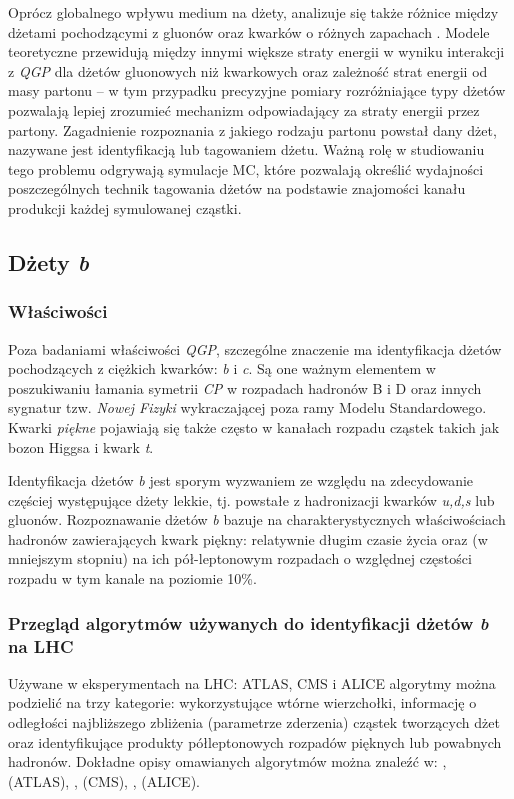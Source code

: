 Oprócz globalnego wpływu medium na dżety, analizuje się także różnice między dżetami pochodzącymi z gluonów oraz kwarków o różnych zapachach . Modele teoretyczne przewidują między innymi większe straty energii w wyniku interakcji z \textit{QGP} dla dżetów gluonowych niż kwarkowych \cite{Salgado:2003gb} oraz zależność strat energii od masy partonu \cite{Dokshitzer:2001zm} -- w tym przypadku precyzyjne pomiary rozróżniające typy dżetów pozwalają lepiej zrozumieć mechanizm odpowiadający za straty energii przez partony. Zagadnienie rozpoznania z jakiego rodzaju partonu powstał dany dżet, nazywane jest identyfikacją lub tagowaniem dżetu.
Ważną rolę w studiowaniu tego problemu odgrywają symulacje MC, które pozwalają określić wydajności poszczególnych technik tagowania dżetów na podstawie znajomości kanału produkcji każdej symulowanej cząstki.

\subsection{Dżety \textit{b}}
\label{subsec:b-dzety}

\subsubsection{Właściwości}
Poza badaniami właściwości \textit{QGP}, szczególne znaczenie ma identyfikacja dżetów pochodzących z ciężkich kwarków: \textit{b} i \textit{c}.
Są one ważnym elementem w poszukiwaniu łamania symetrii \textit{CP} w rozpadach hadronów B i D oraz innych sygnatur tzw. \textit{Nowej Fizyki} wykraczającej poza ramy Modelu Standardowego. 
Kwarki \textit{piękne} pojawiają się także często w kanałach rozpadu cząstek takich jak bozon Higgsa i kwark \textit{t}.

Identyfikacja dżetów \textit{b} jest sporym wyzwaniem ze względu na zdecydowanie częściej występujące dżety lekkie, tj. powstałe z hadronizacji kwarków \textit{u,d,s} lub gluonów.
Rozpoznawanie dżetów \textit{b} bazuje na charakterystycznych właściwościach hadronów zawierających kwark piękny: relatywnie długim czasie życia oraz (w mniejszym stopniu) na ich pół-leptonowym rozpadach o względnej częstości rozpadu w tym kanale  na poziomie 10\%.

\subsubsection{Przegląd algorytmów używanych do identyfikacji dżetów \textit{b} na LHC} 
\label{subsubsec:przeglad-algo}
Używane w eksperymentach na LHC: ATLAS, CMS i ALICE algorytmy można podzielić na trzy kategorie: wykorzystujące wtórne wierzchołki,  informację o odległości najbliższego zbliżenia (parametrze zderzenia) cząstek tworzących dżet  oraz identyfikujące produkty półleptonowych rozpadów pięknych lub powabnych hadronów. Dokładne opisy omawianych algorytmów można znaleźć w: \cite{Aad:2015ydr}, \cite{Sirunyan:2017ezt} (ATLAS), \cite{Chatrchyan:2012jua}, \cite{Sirunyan:2017ezt} (CMS), \cite{Feldkamp:2013cya}, \cite{Haake:2017dpr} (ALICE).

